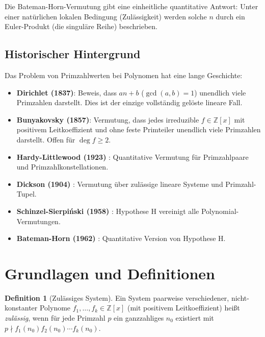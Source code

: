 \documentclass[12pt,a4paper]{amsart}
\theoremstyle{definition}
\newtheorem{definition_de}[theorem]{Definition}
\theoremstyle{remark}
\newcommand{\Z}{\mathbb{Z}}
\begin{document}
Die Bateman-Horn-Vermutung \cite{BH1962} gibt eine einheitliche quantitative Antwort:
Unter einer natürlichen lokalen Bedingung (Zulässigkeit) werden solche $n$ durch ein
Euler-Produkt (die singuläre Reihe) beschrieben.

\subsection{Historischer Hintergrund}

Das Problem von Primzahlwerten bei Polynomen hat eine lange Geschichte:
\begin{itemize}
  \item \textbf{Dirichlet (1837)}: Beweis, dass $an+b$ ($\gcd(a,b)=1$) unendlich viele
    Primzahlen darstellt. Dies ist der einzige vollständig gelöste lineare Fall.
  \item \textbf{Bunyakovsky (1857)}: Vermutung, dass jedes irreduzible $f \in \Z[x]$ mit
    positivem Leitkoeffizient und ohne feste Primteiler unendlich viele Primzahlen
    darstellt. Offen für $\deg f \geq 2$.
  \item \textbf{Hardy-Littlewood (1923)} \cite{HL1923}: Quantitative Vermutung für
    Primzahlpaare und Primzahlkonstellationen.
  \item \textbf{Dickson (1904)} \cite{Dickson1904}: Vermutung über zulässige lineare
    Systeme und Primzahl-Tupel.
  \item \textbf{Schinzel-Sierpiński (1958)} \cite{Schinzel1958}: Hypothese H vereinigt
    alle Polynomial-Vermutungen.
  \item \textbf{Bateman-Horn (1962)} \cite{BH1962}: Quantitative Version von Hypothese H.
\end{itemize}

\section{Grundlagen und Definitionen}\label{sec:grundlagen}

\begin{definition_de}[Zulässiges System]
  Ein System paarweise verschiedener, nicht-konstanter Polynome $f_1, \ldots, f_k \in \Z[x]$
  (mit positivem Leitkoeffizient) heißt \emph{zulässig}, wenn für jede Primzahl $p$
  ein ganzzahliges $n_0$ existiert mit
  $p \nmid f_1(n_0) f_2(n_0) \cdots f_k(n_0)$.
\end{definition_de}
\end{document}
